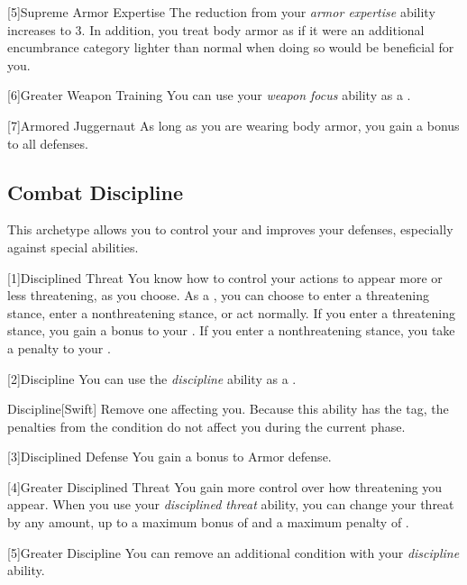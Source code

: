         [5]{Supreme Armor Expertise}
        The  reduction from your \textit{armor expertise} ability increases to 3.
        In addition, you treat body armor as if it were an additional encumbrance category lighter than normal when doing so would be beneficial for you.

        [6]{Greater Weapon Training} You can use your \textit{weapon focus} ability as a .

        [7]{Armored Juggernaut}
        As long as you are wearing body armor, you gain a  bonus to all defenses.

    \subsection{Combat Discipline}
        This archetype allows you to control your  and improves your defenses, especially against special abilities.

        [1]{Disciplined Threat}
        You know how to control your actions to appear more or less threatening, as you choose.
        As a , you can choose to enter a threatening stance, enter a nonthreatening stance, or act normally.
        If you enter a threatening stance, you gain a  bonus to your .
        If you enter a nonthreatening stance, you take a  penalty to your .

        [2]{Discipline} You can use the \textit{discipline} ability as a .
        \begin{apability}{Discipline}[Swift]
            Remove one  affecting you.
            Because this ability has the  tag, the penalties from the condition do not affect you during the current phase.
        \end{apability}

        [3]{Disciplined Defense}
        You gain a  bonus to Armor defense.

        [4]{Greater Disciplined Threat}
        You gain more control over how threatening you appear.
        When you use your \textit{disciplined threat} ability, you can change your threat by any amount, up to a maximum bonus of  and a maximum penalty of .

        [5]{Greater Discipline}
        You can remove an additional condition with your \textit{discipline} ability.

